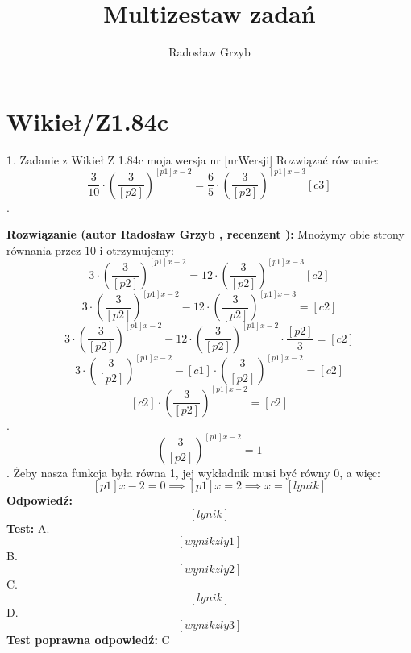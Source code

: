 \documentclass[12pt, a4paper]{article}
\title{Multizestaw zadań}
\author{Radosław Grzyb}
\date{}
\theoremstyle{definition} %
\newtheorem{zad}{}
\newcommand{\kategoria}[1]{\section{#1}} %
\newcommand{\zadStart}[1]{\begin{zad}#1\newline} %
\newcommand{\zadStop}{\end{zad}}   %
\newcommand{\rozwStart}[2]{\noindent \textbf{Rozwiązanie (autor #1 , recenzent #2): }\newline} %
\newcommand{\rozwStop}{\newline}                                            %
\newcommand{\odpStart}{\noindent \textbf{Odpowiedź:}\newline}    %
\newcommand{\odpStop}{\newline}                                             %
\newcommand{\testStart}{\noindent \textbf{Test:}\newline} %
\newcommand{\testStop}{\newline} %
\newcommand{\kluczStart}{\noindent \textbf{Test poprawna odpowiedź:}\newline} %
\newcommand{\kluczStop}{\newline} %
\begin{document}
\maketitle
\kategoria{Wikieł/Z1.84c}
\zadStart{Zadanie z Wikieł Z 1.84c moja wersja nr [nrWersji]}
Rozwiązać równanie:
$$\frac{3}{10}\cdot\left(\frac{3}{[p2]}\right)^{[p1]x-2}=\frac{6}{5}\cdot\left(\frac{3}{[p2]}\right)^{[p1]x-3}[c3]$$.
\zadStop
\rozwStart{Radosław Grzyb}{}
Mnożymy obie strony równania przez $10$ i otrzymujemy:\\
$$3\cdot\left(\frac{3}{[p2]}\right)^{[p1]x-2}=12\cdot\left(\frac{3}{[p2]}\right)^{[p1]x-3}[c2]$$
$$3\cdot\left(\frac{3}{[p2]}\right)^{[p1]x-2}-12\cdot\left(\frac{3}{[p2]}\right)^{[p1]x-3}=[c2]$$
$$3\cdot\left(\frac{3}{[p2]}\right)^{[p1]x-2}-12\cdot\left(\frac{3}{[p2]}\right)^{[p1]x-2}\cdot\frac{[p2]}{3}=[c2]$$
$$3\cdot\left(\frac{3}{[p2]}\right)^{[p1]x-2}-[c1]\cdot\left(\frac{3}{[p2]}\right)^{[p1]x-2}=[c2]$$
$$[c2]\cdot\left(\frac{3}{[p2]}\right)^{[p1]x-2}=[c2]$$.
$$\left(\frac{3}{[p2]}\right)^{[p1]x-2}=1$$.
Żeby nasza funkcja była równa 1, jej wykładnik musi być równy 0, a więc:\\
$$[p1]x-2=0\implies [p1]x=2\implies x=[lynik]$$
\rozwStop
\odpStart
$$[lynik]$$
\odpStop
\testStart
A.$$[wynikzly1]$$
B.$$[wynikzly2]$$
C.$$[lynik]$$
D.$$[wynikzly3]$$
\testStop
\kluczStart
C
\kluczStop
\end{document}
